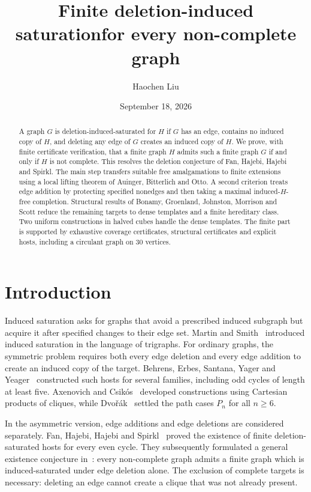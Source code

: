 \documentclass[11pt,reqno]{amsart}
\title[Finite deletion-induced saturation]{Finite deletion-induced saturation\break for every non-complete graph}
\author{Haochen Liu}
\date{September 18, 2026}
\theoremstyle{definition}
\theoremstyle{remark}
\begin{document}
\begin{abstract}
A graph $G$ is deletion-induced-saturated for $H$ if $G$ has an edge, contains no induced copy of $H$, and deleting any edge of $G$ creates an induced copy of $H$. We prove, with finite certificate verification, that a finite graph $H$ admits such a finite graph $G$ if and only if $H$ is not complete. This resolves the deletion conjecture of Fan, Hajebi, Hajebi and Spirkl. The main step transfers suitable free amalgamations to finite extensions using a local lifting theorem of Auinger, Bitterlich and Otto. A second criterion treats edge addition by protecting specified nonedges and then taking a maximal induced-$H$-free completion. Structural results of Bonamy, Groenland, Johnston, Morrison and Scott reduce the remaining targets to dense templates and a finite hereditary class. Two uniform constructions in halved cubes handle the dense templates. The finite part is supported by exhaustive coverage certificates, structural certificates and explicit hosts, including a circulant graph on $30$ vertices.
\end{abstract}
\maketitle

\section{Introduction}

Induced saturation asks for graphs that avoid a prescribed induced subgraph but acquire it after specified changes to their edge set. Martin and Smith~\cite{MS} introduced induced saturation in the language of trigraphs. For ordinary graphs, the symmetric problem requires both every edge deletion and every edge addition to create an induced copy of the target. Behrens, Erbes, Santana, Yager and Yeager~\cite{BE} constructed such hosts for several families, including odd cycles of length at least five. Axenovich and Csik\'os~\cite{AC} developed constructions using Cartesian products of cliques, while Dvo\v{r}\'ak~\cite{Dvorak} settled the path cases $P_n$ for all $n\ge6$.

In the asymmetric version, edge additions and edge deletions are considered separately. Fan, Hajebi, Hajebi and Spirkl~\cite{FHHScycles} proved the existence of finite deletion-saturated hosts for every even cycle. They subsequently formulated a general existence conjecture in~\cite[Conjecture~1.7]{FHHS}: every non-complete graph admits a finite graph which is induced-saturated under edge deletion alone. The exclusion of complete targets is necessary: deleting an edge cannot create a clique that was not already present.
\end{document}
